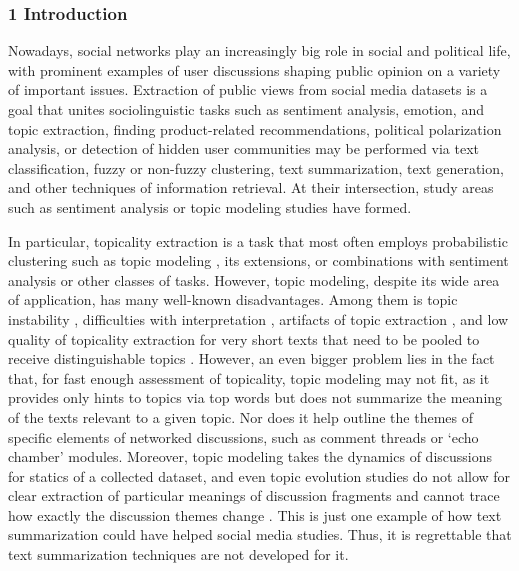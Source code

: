 \subsubsection{1 Introduction}

Nowadays, social networks play an increasingly big role in social and political life, with prominent examples of user discussions shaping public opinion on a variety of important issues. Extraction of public views from social media datasets is a goal that unites sociolinguistic tasks such as sentiment analysis, emotion, and topic extraction, finding product-related recommendations, political polarization analysis, or detection of hidden user communities may be performed via text classification, fuzzy or non-fuzzy clustering, text summarization, text generation, and other techniques of information retrieval. At their intersection, study areas such as sentiment analysis or topic modeling studies have formed.

In particular, topicality extraction is a task that most often employs probabilistic clustering such as topic modeling \cite{KherwaBansal,PotapenkoVorotsov,Bodrunova2021}, its extensions, or combinations with sentiment analysis \cite{RanaCheahLetchmunan} or other classes of tasks. However, topic modeling, despite its wide area of application, has many well-known disadvantages. Among them is topic instability \cite{BlekanovTarasovMaksimov,KoltcovKoltsovaNikolenko2014,BodrunovaKoltcovKoltsova}, difficulties with interpretation \cite{BodrunovaBlekanovKukarkin}, artifacts of topic extraction \cite{BoydGraberMimnoNewman}, and low quality of topicality extraction for very short texts that need to be pooled to receive distinguishable topics \cite{QiangQianLi}. However, an even bigger problem lies in the fact that, for fast enough assessment of topicality, topic modeling may not fit, as it provides only hints to topics via top words but does not summarize the meaning of the texts relevant to a given topic. Nor does it help outline the themes of specific elements of networked discussions, such as comment threads or ‘echo chamber’ modules. Moreover, topic modeling takes the dynamics of discussions for statics of a collected dataset, and even topic evolution studies do not allow for clear extraction of particular meanings of discussion fragments and cannot trace how exactly the discussion themes change \cite{SmoliarovaBodrunovaYakunin}. This is just one example of how text summarization could have helped social media studies. Thus, it is regrettable that text summarization techniques are not developed for it.

